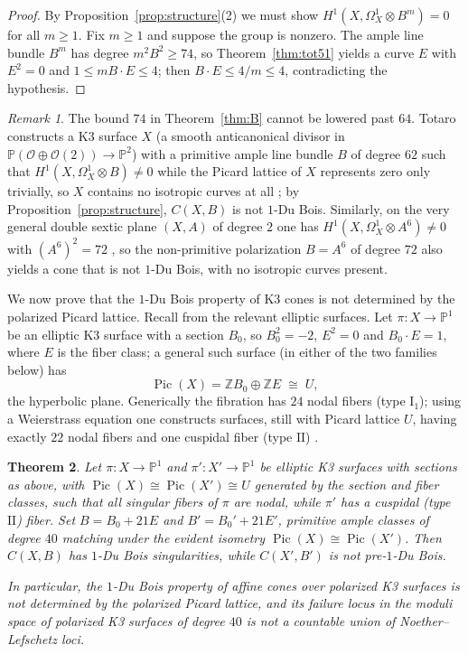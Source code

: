 \documentclass[11pt]{amsart}
\numberwithin{equation}{section}
\theoremstyle{plain}
\newtheorem{theorem}{Theorem}[section]
\theoremstyle{definition}
\theoremstyle{remark}
\newtheorem{remark}[theorem]{Remark}
\newcommand{\ZZ}{\mathbb{Z}}
\newcommand{\PP}{\mathbb{P}}
\newcommand{\cO}{\mathcal{O}}
\newcommand{\Pic}{\operatorname{Pic}}
\begin{document}
\begin{proof}
By Proposition~\ref{prop:structure}(2) we must show $H^1(X,\Omega^1_X\otimes B^m)=0$ for all $m\ge1$.
Fix $m\ge1$ and suppose the group is nonzero. The ample line bundle $B^m$ has degree $m^2B^2\ge74$, so Theorem~\ref{thm:tot51} yields a curve $E$ with $E^2=0$ and $1\le mB\cdot E\le4$; then $B\cdot E\le 4/m\le4$, contradicting the hypothesis.
\end{proof}

\begin{remark}\label{rem:sharpness}
The bound $74$ in Theorem~\ref{thm:B} cannot be lowered past $64$.
Totaro constructs a K3 surface $X$ (a smooth anticanonical divisor in $\PP(\cO\oplus\cO(2))\to\PP^2$) with a primitive ample line bundle $B$ of degree $62$ such that $H^1(X,\Omega^1_X\otimes B)\ne0$ while the Picard lattice of $X$ represents zero only trivially, so $X$ contains no isotropic curves at all \cite[Ex.~5.3]{Tot}; by Proposition~\ref{prop:structure}, $C(X,B)$ is not $1$-Du Bois.
Similarly, on the very general double sextic plane $(X,A)$ of degree $2$ one has $H^1(X,\Omega^1_X\otimes A^6)\ne0$ with $(A^6)^2=72$ \cite[Ex.~5.2]{Tot}, so the non-primitive polarization $B=A^6$ of degree $72$ also yields a cone that is not $1$-Du Bois, with no isotropic curves present.
\end{remark}

We now prove that the $1$-Du Bois property of K3 cones is not determined by the polarized Picard lattice.
Recall from \cite[\S6]{Tot} the relevant elliptic surfaces.
Let $\pi\colon X\to\PP^1$ be an elliptic K3 surface with a section $B_0$, so $B_0^2=-2$, $E^2=0$ and $B_0\cdot E=1$, where $E$ is the fiber class; a general such surface (in either of the two families below) has
\[
\Pic(X)=\ZZ B_0\oplus\ZZ E\;\cong\;U,
\]
the hyperbolic plane.
Generically the fibration has $24$ nodal fibers (type $\mathrm{I}_1$); using a Weierstrass equation one constructs surfaces, still with Picard lattice $U$, having exactly $22$ nodal fibers and one cuspidal fiber (type $\mathrm{II}$) \cite[\S6]{Tot}.

\begin{theorem}\label{thm:C}
Let $\pi\colon X\to\PP^1$ and $\pi'\colon X'\to\PP^1$ be elliptic K3 surfaces with sections as above, with $\Pic(X)\cong\Pic(X')\cong U$ generated by the section and fiber classes, such that all singular fibers of $\pi$ are nodal, while $\pi'$ has a cuspidal (type $\mathrm{II}$) fiber.
Set $B=B_0+21E$ and $B'=B_0'+21E'$, primitive ample classes of degree $40$ matching under the evident isometry $\Pic(X)\cong\Pic(X')$.
Then $C(X,B)$ has $1$-Du Bois singularities, while $C(X',B')$ is not pre-$1$-Du Bois.

In particular, the $1$-Du Bois property of affine cones over polarized K3 surfaces is not determined by the polarized Picard lattice, and its failure locus in the moduli space of polarized K3 surfaces of degree $40$ is not a countable union of Noether--Lefschetz loci.
\end{theorem}
\end{document}
